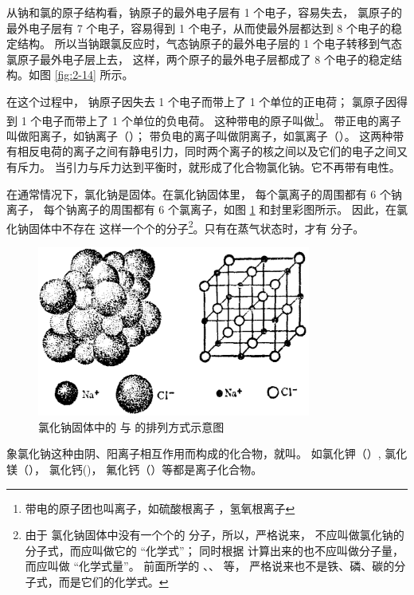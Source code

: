 从钠和氯的原子结构看，钠原子的最外电子层有 1 个电子，容易失去，
氯原子的最外电子层有 7 个电子，容易得到 1 个电子，从而使最外层都达到 8 个电子的稳定结构。
所以当钠跟氯反应时，气态钠原子的最外电子层的 1 个电子转移到气态氯原子最外电子层上去，
这样，两个原子的最外电子层都成了 8 个电子的稳定结构。如图 \ref{fig:2-14} 所示。

在这个过程中，
钠原子因失去 1 个电子而带上了 1 个单位的正电荷；
氯原子因得到 1 个电子而带上了 1 个单位的负电荷。
这种带电的原子叫做\footnote{带电的原子团也叫离子，如硫酸根离子 ，氢氧根离子 }。
带正电的离子叫做阳离子，如钠离子（）；
带负电的离子叫做阴离子，如氯离子（）。
这两种带有相反电荷的离子之间有静电引力，同时两个离子的核之间以及它们的电子之间又有斥力。
当引力与斥力达到平衡时，就形成了化合物氯化钠。它不再带有电性。
\begin{fangchengshi}
\end{fangchengshi}

在通常情况下，氯化钠是固体。在氯化钠固体里，
每个氯离子的周围都有 6 个钠离子，
每个钠离子的周围都有 6 个氯离子，如图 \ref{fig:2-15} 和封里彩图所示。
因此，在氯化钠固体中不存在  这样一个个的分子\footnote{由于
    氯化钠固体中没有一个个的  分子，所以，严格说来，
     不应叫做氯化钠的分子式，而应叫做它的 “化学式”；
    同时根据  计算出来的也不应叫做分子量，而应叫做 “化学式量”。
    前面所学的 、、 等，
    严格说来也不是铁、磷、碳的分子式，而是它们的化学式。
}。只有在蒸气状态时，才有  分子。

\begin{figure}[htbp]
    \centering
    \includegraphics[width=9cm]{../pic/czhx1-ch2-15}
    \caption{氯化钠固体中的  与  的排列方式示意图}\label{fig:2-15}
\end{figure}

象氯化钠这种由阴、阳离子相互作用而构成的化合物，就叫。
如氯化钾（）, 氯化镁（）， 氯化钙()，
氟化钙（）等都是离子化合物。

